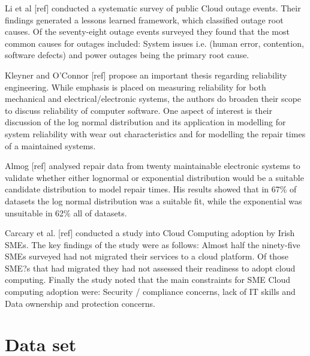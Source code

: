 \documentclass[conference]{IEEEtran}
\begin{document}
Li et al [ref] conducted a systematic survey of public Cloud outage events. Their findings generated a lessons learned framework, which classified outage root causes. Of the seventy-eight outage events surveyed they found that the most common causes for outages included: System issues i.e. (human error, contention, software defects) and power outages being the primary root cause. \par

Kleyner and O'Connor [ref] propose an important thesis regarding reliability engineering. While emphasis is placed on measuring reliability for both mechanical and electrical/electronic systems, the authors do broaden their scope to discuss reliability of computer software. One aspect of interest is their discussion of the log normal distribution and its application in modelling for system reliability with wear out characteristics and for modelling the repair times of a maintained systems. \par

Almog [ref] analysed repair data from twenty maintainable electronic systems to validate whether either lognormal or exponential distribution would be a suitable candidate distribution to model repair times. His results showed that in 67\% of datasets the log normal distribution was a suitable fit, while the exponential was unsuitable in 62\% all of datasets. \par

Carcary et al. [ref] conducted a study into Cloud Computing adoption by Irish SMEs. The key findings of the study were as follows: Almost half the ninety-five SMEs surveyed had not migrated their services to a cloud platform. Of those SME?s that had migrated they had not assessed their readiness to adopt cloud computing. Finally the study noted that the main constraints for SME Cloud computing adoption were: Security / compliance concerns, lack of IT skills and Data ownership and protection concerns. \par
\section{Data set}
\end{document}
